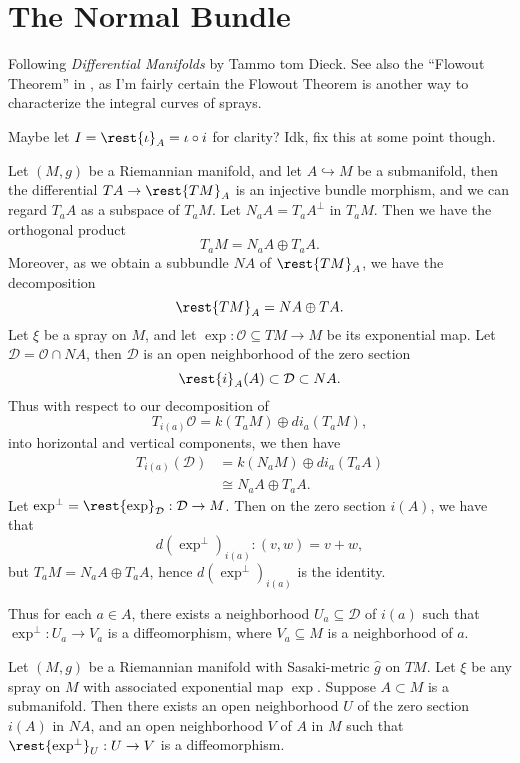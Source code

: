 



\section{The Normal Bundle}

\begin{tcolorbox}
	Following \textit{Differential Manifolds} by Tammo tom Dieck.  See also the ``Flowout Theorem'' in \cite{lee2003smooth}, as I'm fairly certain the Flowout Theorem is another way to characterize the integral curves of sprays.
	
	Maybe let $I=\rest{\iota}_A=\iota\circ i$ for clarity?  Idk, fix this at some point though.
	
	\cite{borisenko1987sasaki}
\end{tcolorbox}


Let $(M,g)$ be a Riemannian manifold, and let $A\hookrightarrow M$ be a submanifold, then the differential $TA\to\rest{TM}_A$ is an injective bundle morphism, and we can regard $T_aA$ as a subspace of $T_aM$.  Let $N_aA=T_aA^\perp$ in $T_aM$.  Then we have the orthogonal product
$$T_aM=N_aA\oplus T_aA.$$
Moreover, as we obtain a subbundle $NA$ of $\rest{TM}_A$, we have the decomposition
$$\rest{TM}_A=NA\oplus TA.$$
Let $\xi$ be a spray on $M$, and let $\exp:\mathcal{O}\subseteq TM\to M$ be its exponential map.  Let $\mathcal{D}=\mathcal{O}\cap NA$, then $\mathcal{D}$ is an open neighborhood of the zero section
$$\rest{i}_A(A)\subset\mathcal{D}\subset NA.$$
Thus with respect to our decomposition of
$$T_{i(a)}\mathcal{O}=k(T_aM)\oplus di_a(T_aM),$$
into horizontal and vertical components, we then have
\begin{align*}
	T_{i(a)}(\mathcal{D})&=k(N_aM)\oplus di_a(T_aA)\\
	&\cong N_aA\oplus T_aA.
\end{align*}
Let $\exp^\perp=\rest{\exp}_{\mathcal{D}}:\mathcal{D}\to M$.  Then on the zero section $i(A)$, we have that
$$d(\exp^\perp)_{i(a)}:(v,w)=v+w,$$
but $T_aM=N_aA\oplus T_aA$, hence $d(\exp^\perp)_{i(a)}$ is the identity.

Thus for each $a\in A$, there exists a neighborhood $U_a\subseteq\mathcal{D}$ of $i(a)$ such that $\exp^\perp:U_a\to V_a$ is a diffeomorphism, where $V_a\subseteq M$ is a neighborhood of $a$.

\begin{thm}\label{thm:tublar}
    Let $(M,g)$ be a Riemannian manifold with Sasaki-metric $\hat{g}$ on $TM$.  Let $\xi$ be any spray on $M$ with associated exponential map $\exp$.  Suppose $A\subset M$ is a submanifold.  Then there exists an open neighborhood $U$ of the zero section $i(A)$ in $NA$, and an open neighborhood $V$ of $A$ in $M$ such that $\rest{\exp^\perp}_U:U\to V$ is a diffeomorphism.
\end{thm}

